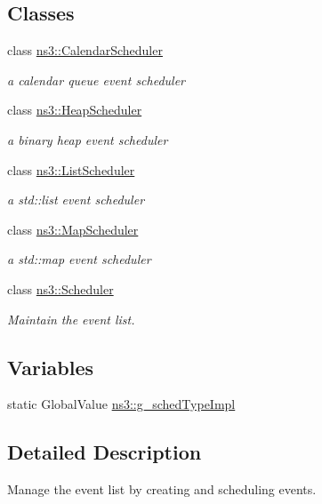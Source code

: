 \subsection*{Classes}
\begin{DoxyCompactItemize}
\item 
class \hyperlink{classns3_1_1CalendarScheduler}{ns3\+::\+Calendar\+Scheduler}
\begin{DoxyCompactList}\small\item\em a calendar queue event scheduler \end{DoxyCompactList}\item 
class \hyperlink{classns3_1_1HeapScheduler}{ns3\+::\+Heap\+Scheduler}
\begin{DoxyCompactList}\small\item\em a binary heap event scheduler \end{DoxyCompactList}\item 
class \hyperlink{classns3_1_1ListScheduler}{ns3\+::\+List\+Scheduler}
\begin{DoxyCompactList}\small\item\em a std\+::list event scheduler \end{DoxyCompactList}\item 
class \hyperlink{classns3_1_1MapScheduler}{ns3\+::\+Map\+Scheduler}
\begin{DoxyCompactList}\small\item\em a std\+::map event scheduler \end{DoxyCompactList}\item 
class \hyperlink{classns3_1_1Scheduler}{ns3\+::\+Scheduler}
\begin{DoxyCompactList}\small\item\em Maintain the event list. \end{DoxyCompactList}\end{DoxyCompactItemize}
\subsection*{Variables}
\begin{DoxyCompactItemize}
\item 
static Global\+Value \hyperlink{group__scheduler_ga8af85a17944949f1274576b38863d8f0}{ns3\+::g\+\_\+sched\+Type\+Impl}
\end{DoxyCompactItemize}


\subsection{Detailed Description}
Manage the event list by creating and scheduling events. 



